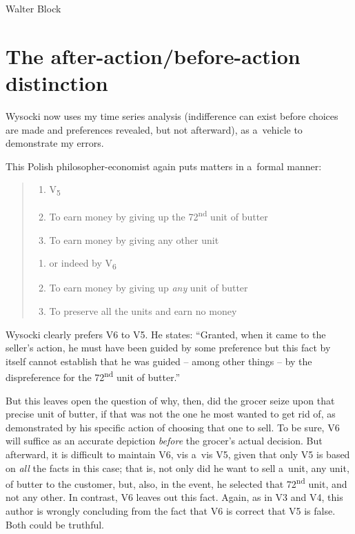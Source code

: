 \begin{artengenv}{Walter Block}
\section{The after-action/before-action distinction }

Wysocki now uses my time series analysis (indifference can exist before choices are made and preferences revealed, but not afterward), as a~vehicle to demonstrate my errors.



This Polish philosopher-economist again puts matters in a~formal manner:



\begin{quote}
\begin{enumerate}[label=(\arabic*)]
\item[]\makebox[-1.7em][l]{}V\textsubscript{5}
\item To earn money by giving up the 72\textsuperscript{nd }unit of butter
\item To earn money by giving any other unit
\end{enumerate}
\vspace{-1em}
\begin{enumerate}[label=(\arabic*)]
\item[]\makebox[-1.7em][l]{}or indeed by V\textsubscript{6}
\item To earn money by giving up \textit{any} unit of butter
\item To preserve all the units and earn no money
\end{enumerate}
\end{quote}



Wysocki clearly prefers V6 to V5. He states: ``Granted, when it came to the seller's action, he must have been guided by some preference but this fact by itself cannot establish that he was guided -- among other things -- by the dispreference for the 72\textsuperscript{nd} unit of butter.''



But this leaves open the question of why, then, did the grocer seize upon that precise unit of butter, if that was not the one he most wanted to get rid of, as demonstrated by his specific action of choosing that one to sell. To be sure, V6 will suffice as an accurate depiction \textit{before} the grocer's actual decision. But afterward, it is difficult to maintain V6, vis a~vis V5, given that only V5 is based on \textit{all} the facts in this case; that is, not only did he want to sell a~unit, any unit, of butter to the customer, but, also, in the event, he selected that 72\textsuperscript{nd} unit, and not any other. In contrast, V6 leaves out this fact. Again, as in V3 and V4, this author is wrongly concluding from the fact that V6 is correct that V5 is false. Both could be truthful.




\end{artengenv}
